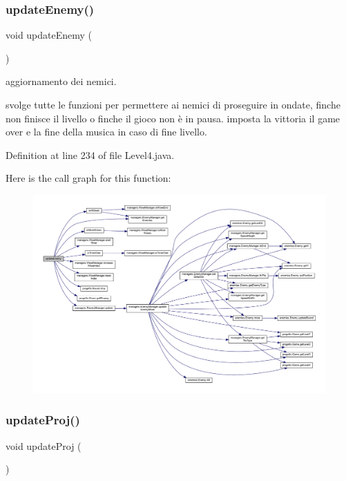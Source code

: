 \subsubsection{\texorpdfstring{update\+Enemy()}{updateEnemy()}}
{\footnotesize\ttfamily void update\+Enemy (\begin{DoxyParamCaption}{ }\end{DoxyParamCaption})}



aggiornamento dei nemici. 

svolge tutte le funzioni per permettere ai nemici di proseguire in ondate, finche non finisce il livello o finche il gioco non è in pausa. imposta la vittoria il game over e la fine della musica in caso di fine livello. 

Definition at line 234 of file Level4.\+java.

Here is the call graph for this function\+:
\nopagebreak
\begin{figure}[H]
\begin{center}
\leavevmode
\includegraphics[width=350pt]{classscenes_1_1_level4_af005ec68c869a6acd5e833cba9330a50_cgraph}
\end{center}
\end{figure}
\mbox{\label{classscenes_1_1_level4_ac83c203b559f6fd0bb225744d7ccf854}} 
\subsubsection{\texorpdfstring{update\+Proj()}{updateProj()}}
{\footnotesize\ttfamily void update\+Proj (\begin{DoxyParamCaption}{ }\end{DoxyParamCaption})}




